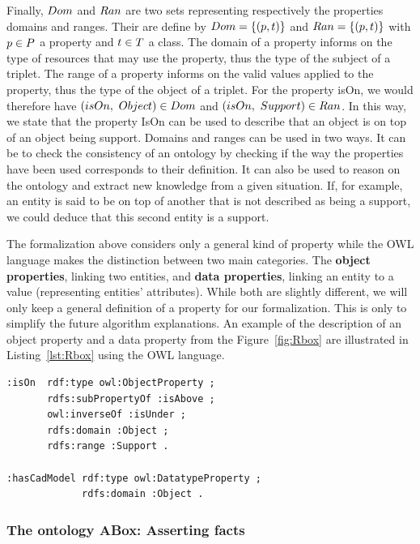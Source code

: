 Finally, $Dom$ and $Ran$ are two sets representing respectively the properties domains and ranges. Their are define by $Dom = \{(p, t)\}$ and $Ran = \{(p, t)\}$ with $p \in P$ a property and $t \in T$ a class. The domain of a property informs on the type of resources that may use the property, thus the type of the subject of a triplet. The range of a property informs on the valid values applied to the property, thus the type of the object of a triplet. For the property isOn, we would therefore have $(isOn,\ Object) \in Dom$ and $(isOn,\ Support) \in Ran$. In this way, we state that the property IsOn can be used to describe that an object is on top of an object being support. Domains and ranges can be used in two ways. It can be to check the consistency of an ontology by checking if the way the properties have been used corresponds to their definition. It can also be used to reason on the ontology and extract new knowledge from a given situation. If, for example, an entity is said to be on top of another that is not described as being a support, we could deduce that this second entity is a support.

The formalization above considers only a general kind of property while the OWL language makes the distinction between two main categories. The \textbf{object properties}, linking two entities, and \textbf{data properties}, linking an entity to a value (representing entities' attributes). While both are slightly different, we will only keep a general definition of a property for our formalization. This is only to simplify the future algorithm explanations. An example of the description of an object property and a data property from the Figure~\ref{fig:Rbox} are illustrated in Listing~\ref{lst:Rbox} using the OWL language.

\begin{lstlisting}[frame=single, basicstyle=\scriptsize\ttfamily, label={lst:Rbox}, caption={Description of ontology properties in the OWL language using the Turle syntax.},captionpos=b, style=OwlTurtle]
:isOn  rdf:type owl:ObjectProperty ;
       rdfs:subPropertyOf :isAbove ;
       owl:inverseOf :isUnder ;
       rdfs:domain :Object ;
       rdfs:range :Support .

:hasCadModel rdf:type owl:DatatypeProperty ;
             rdfs:domain :Object .
\end{lstlisting}

\subsubsection{The ontology ABox: Asserting facts}

